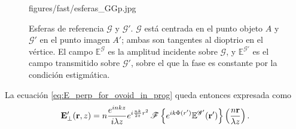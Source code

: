 \begin{figure}[H]
  \centering
    {figures/fast/esferas_GGp.jpg}
  \caption{Esferas de referencia $\mathscr G$ y $\mathscr G'$. $\mathscr G$ está centrada en el punto objeto $A$ y $\mathscr G'$ en el punto imagen $A'$; ambas son tangentes al dioptrio en el vértice. El campo $\mathbb E^{\mathscr G}$ es la amplitud incidente sobre $\mathscr G$, y $\mathbb E^{\mathscr G'}$ es el campo transmitido sobre $\mathscr G'$, sobre el que la fase es constante por la condición estigmática.}
  \label{fig:EGs}
\end{figure}

La ecuación \eqref{eq:E_perp_for_ovoid_in_prog} queda entonces expresada como
\begin{equation}
\vb{E}'_\perp(\vb r,z)
=
n\frac{e^{inkz}}{i\lambda z}e^{i\frac{nk}{2z}r^2}
\,
\mathscr F
\left\{
e^{ik\Phi(r')} \mathbb E^{\mathscr G'}(\vb r')
\right\}
\left(
\frac{n\vb r}{\lambda z}
\right).
\label{eq:E_field_perp_no_phase_replacement}
\end{equation}

